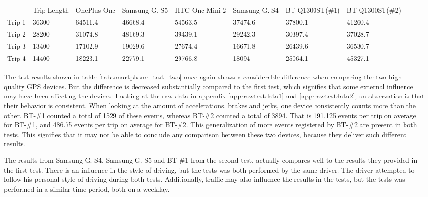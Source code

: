 \begin{table*}[tb]
\centering
\caption{My caption}
\label{tab:smartphone_test_two}
\begin{tabular}{llllllll}
       & Trip Length & OnePlus One & Samsung G. S5 & HTC One Mini 2 & Samsung G. S4 & BT-Q1300ST(\#1) & BT-Q1300ST(\#2) \\
Trip 1 & 36300       & 64511.4     & 46668.4           & 54563.5        & 37474.6           & 37800.1         & 41260.4         \\
Trip 2 & 28200       & 31074.8     & 48169.3           & 39439.1        & 29242.3           & 30397.4         & 37028.7         \\
Trip 3 & 13400       & 17102.9     & 19029.6           & 27674.4        & 16671.8           & 26439.6         & 36530.7         \\
Trip 4 & 14400       & 18223.1     & 22779.1           & 29766.8        & 18094             & 25064.1         & 45327.1        
\end{tabular}
\end{table*}

The test results shown in table \ref{tab:smartphone_test_two} once again shows a considerable difference when comparing the two high quality GPS devices. But the difference is decreased substantially compared to the first test, which signifies that some external influence may have been affecting the devices. Looking at the raw data in appendix \ref{app:rawtestdata1} and \ref{app:rawtestdata2}, an observation is that their behavior is consistent. When looking at the amount of accelerations, brakes and jerks, one device consistently counts more than the other. BT-\#1 counted a total of 1529 of these events, whereas BT-\#2 counted a total of 3894. That is 191.125 events per trip on average for BT-\#1, and 486.75 events per trip on average for BT-\#2. This generalization of more events registered by BT-\#2 are present in both tests. This signifies that it may not be able to conclude any comparison between these two devices, because they deliver such different results.

The results from Samsung G. S4, Samsung G. S5 and BT-\#1 from the second test, actually compares well to the results they provided in the first test. There is an influence in the style of driving, but the tests was both performed by the same driver. The driver attempted to follow his personal style of driving during both tests. Additionally, traffic may also influence the results in the tests, but the tests was performed in a similar time-period, both on a weekday. 


